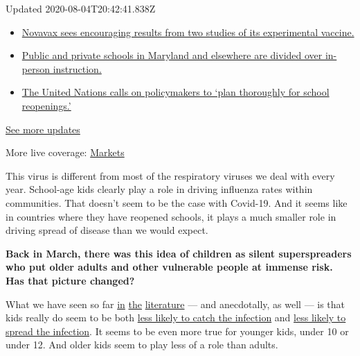 Updated 2020-08-04T20:42:41.838Z

\begin{itemize}
\tightlist
\item
  \href{https://www.nytimes.com/2020/08/04/world/coronavirus-cases.html?action=click\&pgtype=Article\&state=default\&region=MAIN_CONTENT_1\&context=storylines_live_updates\#link-1228a480}{Novavax
  sees encouraging results from two studies of its experimental
  vaccine.}
\item
  \href{https://www.nytimes.com/2020/08/04/world/coronavirus-cases.html?action=click\&pgtype=Article\&state=default\&region=MAIN_CONTENT_1\&context=storylines_live_updates\#link-4825b93}{Public
  and private schools in Maryland and elsewhere are divided over
  in-person instruction.}
\item
  \href{https://www.nytimes.com/2020/08/04/world/coronavirus-cases.html?action=click\&pgtype=Article\&state=default\&region=MAIN_CONTENT_1\&context=storylines_live_updates\#link-50f7386d}{The
  United Nations calls on policymakers to `plan thoroughly for school
  reopenings.'}
\end{itemize}

\href{https://www.nytimes.com/2020/08/04/world/coronavirus-cases.html?action=click\&pgtype=Article\&state=default\&region=MAIN_CONTENT_1\&context=storylines_live_updates}{See
more updates}

More live coverage:
\href{https://www.nytimes.com/live/2020/08/04/business/stock-market-today-coronavirus?action=click\&pgtype=Article\&state=default\&region=MAIN_CONTENT_1\&context=storylines_live_updates}{Markets}

This virus is different from most of the respiratory viruses we deal
with every year. School-age kids clearly play a role in driving
influenza rates within communities. That doesn't seem to be the case
with Covid-19. And it seems like in countries where they have reopened
schools, it plays a much smaller role in driving spread of disease than
we would expect.

\textbf{Back in March, there was this idea of children as silent
superspreaders who put older adults and other vulnerable people at
immense risk. Has that picture changed?}

What we have seen so far
\href{https://academic.oup.com/cid/article/doi/10.1093/cid/ciaa794/5862649}{in}
\href{https://www.thelancet.com/journals/lanchi/article/PIIS2352-4642(20)30095-X/fulltext\#seccestitle20}{the}
\href{https://adc.bmj.com/content/105/7/618}{literature} --- and
anecdotally, as well --- is that kids really do seem to be both
\href{https://pubmed.ncbi.nlm.nih.gov/32546824/}{less likely to catch
the infection} and
\href{https://pediatrics.aappublications.org/content/early/2020/05/22/peds.2020-004879}{less
likely to spread the infection}. It seems to be even more true for
younger kids, under 10 or under 12. And older kids seem to play less of
a role than adults.

